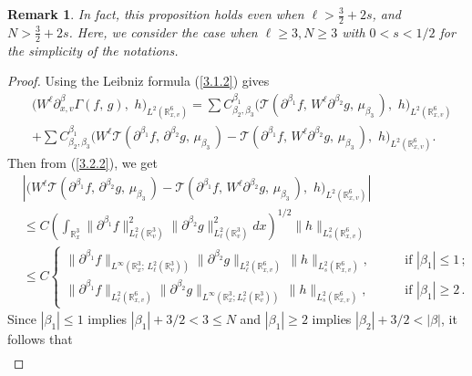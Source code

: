\documentclass{amsart}[12pt, article]
\newtheorem{rema}[theo]{Remark}
\begin{document}
\begin{rema}
In fact, this proposition holds even when
 $\ell> \frac 32 +2s$, and $ N> \frac 32 +2s$.
  Here, we consider the case
   when $\ell\geq 3, N\geq 3$ with $0<s<1/2$ for the
    simplicity of  the notations.
\end{rema}

\begin{proof}
Using the Leibniz formula (\ref{3.1.2}) gives
\begin{align*}
&\Big(W^\ell \partial^\beta_{x, v}\Gamma(f,\, g),\,\,
h\Big)_{L^2({{{\mathbb R}}}^6_{x, v})}= \sum C^{\beta_1}_{\beta_2, \beta_3}
\Big({{\mathcal T}}(\partial^{\beta_1} f,\, W^\ell \partial^{\beta_2} g,\,
\mu_{\beta_3}\,) ,\,\, h\Big)_{L^2({{{\mathbb R}}}^6_{x, v})}\\
&+\sum C^{\beta_1}_{\beta_2, \beta_3}
\Big(W^\ell{{\mathcal T}}(\partial^{\beta_1} f,\, \partial^{\beta_2} g,\,
\mu_{\beta_3}\,) - {{\mathcal T}}(\partial^{\beta_1} f,\, W^\ell
\partial^{\beta_2} g,\, \mu_{\beta_3}\,) ,\,\,
h\Big)_{L^2({{{\mathbb R}}}^6_{x, v})}.
\end{align*}
Then {}from (\ref{3.2.2}), we get
\begin{align*}
& \left|\Big(W^\ell{{\mathcal T}}(\partial^{\beta_1} f,\,
\partial^{\beta_2} g,\, \mu_{\beta_3}\,)
- {{\mathcal T}}(\partial^{\beta_1}f,\, W^\ell
\partial^{\beta_2} g,\, \mu_{\beta_3}\,)
,\,\, h\Big)_{L^2({{{\mathbb R}}}^6_{x, v})}\right|\\
&\leq C \left(\int_{{{{\mathbb R}}}^3_x} \|\partial^{\beta_1}
f\|^2_{L^2_\ell({{{\mathbb R}}}^3_v)} \|\partial^{\beta_2}
g\|^2_{L^2_\ell({{{\mathbb R}}}^3_v)} dx\right)^{1/2}\|h\|_{L^2_s({{{\mathbb R}}}^6_{x,
v})}\\
&\leq C\left\{\begin{array}{ll} \|\partial^{\beta_1}
f\|_{L^\infty({{{\mathbb R}}}^3_x;\, L^2_\ell({{{\mathbb R}}}^3_v))} \|\partial^{\beta_2}
g\|_{L^2_\ell({{{\mathbb R}}}^6_{x, v})}\, \|h\|_{L^2_s({{{\mathbb R}}}^6_{x, v})},
&\qquad\mbox{if}\,\, |\beta_1|\leq 1\, ;\\
\|\partial^{\beta_1} f\|_{L^2_\ell({{{\mathbb R}}}^6_{x, v})}
\|\partial^{\beta_2} g\|_{L^\infty({{{\mathbb R}}}^3_x; L^2_\ell({{{\mathbb R}}}^3_v))}\,
\|h\|_{L^2_s({{{\mathbb R}}}^6_{x, v})},&\qquad\mbox{if}\,\, |\beta_1|\geq 2\, .
\end{array}
\right.
\end{align*}
Since $|\beta_1|\leq 1$ implies $|\beta_1|+3/2< 3\leq N$ and
$|\beta_1|\geq 2$ implies $|\beta_2|+3/2< |\beta|$, it follows that
\begin{align}\label{3.2.6+1}

\end{align}
\end{proof}
\end{document}
